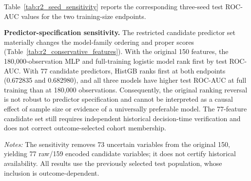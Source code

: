 \documentclass[10pt]{article}
\begin{document}
Table~\ref{tab:r2_seed_sensitivity} reports the corresponding three-seed test ROC-AUC values for the two training-size endpoints.

\noindent\textbf{Predictor-specification sensitivity.} The restricted candidate predictor set materially changes the model-family ordering and proper scores (Table~\ref{tab:r2_conservative_features}). With the original 150 features, the 180,000-observation MLP and full-training logistic model rank first by test ROC-AUC. With 77 candidate predictors, HistGB ranks first at both endpoints (0.672835 and 0.682980), and all three models have higher test ROC-AUC at full training than at 180,000 observations. Consequently, the original ranking reversal is not robust to predictor specification and cannot be interpreted as a causal effect of sample size or evidence of a universally preferable model. The 77-feature candidate set still requires independent historical decision-time verification and does not correct outcome-selected cohort membership.

\begin{table}[!ht]
\centering
\caption{Original versus conservative-candidate feature sensitivity, holding the seed, cohorts and estimator settings fixed. Lower Brier scores are better.}
\label{tab:r2_conservative_features}
\vspace{2pt}
{\footnotesize \textit{Notes:} The sensitivity removes 73 uncertain variables from the original 150, yielding 77 raw/159 encoded candidate variables; it does not certify historical availability. All results use the previously selected test population, whose inclusion is outcome-dependent.}
\end{table}
\end{document}
